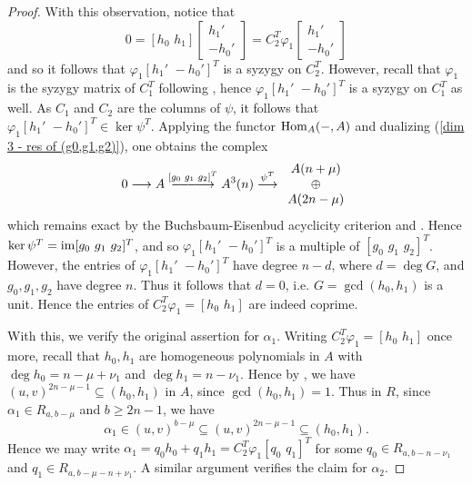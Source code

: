 \documentclass[reqno]{amsart}
\numberwithin{equation}{section}
\theoremstyle{definition}
\def\im{\mathop{\rm im}}
\def\Hom{{\rm Hom}}
\DeclareRobustCommand{\longerrightarrow}{
\DOTSB\relbar\joinrel\relbar\joinrel\relbar\joinrel\relbar\joinrel\rightarrow
}
\begin{document}
\begin{proof}
With this observation, notice that
$$ 0 = [h_0\,\,h_1]\begin{bmatrix}
    h_1'\\
    -h_0'
\end{bmatrix} = C_2^T\varphi_1 \begin{bmatrix}
    h_1'\\
    -h_0'
\end{bmatrix}$$
and so it follows that $\varphi_1 [h_1'\,\,-h_0']^T$ is a syzygy on $C_2^T$. However, recall that $\varphi_1$ is the syzygy matrix of $C_1^T$ following , hence $\varphi_1 [h_1'\,\,-h_0']^T$ is a syzygy on $C_1^T$ as well. As $C_1$ and $C_2$ are the columns of $\psi$, it follows that $\varphi_1 [h_1'\,\,-h_0']^T \in \ker \psi^T$. Applying the functor $\Hom_A(-,A)$ and dualizing (\ref{dim 3 - res of (g0,g1,g2)}), one obtains the complex
\begin{equation}\label{dim 3 - dualized res of (g0,g1,g2)}
 0 \longrightarrow 
 A
 \overset{[g_0\,\,g_1\,\,g_2]^T}{\longerrightarrow}
 A^3(n)
 \overset{\psi^T}{\longrightarrow}
 \begin{array}{c}
 A(n+\mu)\\
 \oplus \\
A(2n-\mu)
\end{array}
\end{equation}
which remains exact by the Buchsbaum-Eisenbud acyclicity criterion \cite[Cor. 1]{BE73} and . Hence $\ker \psi^T = \im [g_0\,\,g_1\,\,g_2]^T$, and so $\varphi_1 [h_1'\,\,-h_0']^T$ is a multiple of $[g_0\,\,g_1\,\,g_2]^T$. However, the entries of $\varphi_1 [h_1'\,\,-h_0']^T$ have degree $n-d$, where $d=\deg G$, and $g_0,g_1,g_2$ have degree $n$. Thus it follows that $d=0$, i.e. $G= \gcd(h_0,h_1)$ is a unit. Hence the entries of $C_2^T\varphi_1 = [h_0\,\,h_1]$ are indeed coprime.



With this, we verify the original assertion for $\alpha_1$. Writing $C_2^T\varphi_1 = [h_0\,\,h_1]$ once more, recall that $h_0, h_1$ are homogeneous polynomials in $A$ with $\deg h_0 = n-\mu+\nu_1$ and $\deg h_1= n- \nu_1$. Hence by , we have $(u,v)^{2n-\mu-1} \subseteq (h_0,h_1)$ in $A$, since $\gcd(h_0,h_1)=1$. Thus in $R$, since $\alpha_1 \in R_{a,b-\mu}$ and $b\geq 2n-1$, we have 
$$\alpha_1 \in (u,v)^{b-\mu} \subseteq (u,v)^{2n-\mu-1} \subseteq (h_0,h_1).$$
Hence we may write $\alpha_1 = q_0h_0+q_1h_1 = C_2^T\varphi_1 [q_0\,\,q_1]^T$ for some $q_0\in R_{a,b-n-\nu_1}$ and $q_1 \in R_{a,b-\mu-n+\nu_1}$. A similar argument verifies the claim for $\alpha_2$. 
\end{proof}
\end{document}
